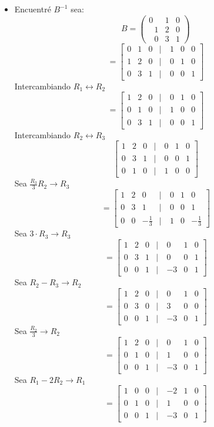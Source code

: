 \begin{itemize}
    \item Encuentré \textbf{$B^{-1}$}
    sea: $$B=\begin{pmatrix}0&1&0\\ \:\:\:1&2&0\\ \:\:\:0&3&1\end{pmatrix}$$
    $$    =\begin{bmatrix}0&1&0&\mid \:&1&0&0\\ 1&2&0&\mid \:&0&1&0\\ 0&3&1&\mid \:&0&0&1\end{bmatrix}$$
    Intercambiando $R_1 \leftrightarrow R_2$
    $$=\begin{bmatrix}1&2&0&\mid \:&0&1&0\\ 0&1&0&\mid \:&1&0&0\\ 0&3&1&\mid \:&0&0&1\end{bmatrix}$$
    Intercambiando $R_2 \leftrightarrow R_3$
    $$\begin{bmatrix}1&2&0&\mid \:&0&1&0\\ 0&3&1&\mid \:&0&0&1\\ 0&1&0&\mid \:&1&0&0\end{bmatrix}$$
    Sea $\frac{R_3}{3}R_2\rightarrow R_3$
    $$=\begin{bmatrix}1&2&0&\mid \:&0&1&0\\ 0&3&1&\mid \:&0&0&1\\ 0&0&-\frac{1}{3}&\mid \:&1&0&-\frac{1}{3}\end{bmatrix}$$
    Sea $3·R_3\rightarrow R_3$
    $$=\begin{bmatrix}1&2&0&\mid \:&0&1&0\\ 0&3&1&\mid \:&0&0&1\\ 0&0&1&\mid \:&-3&0&1\end{bmatrix}$$
    Sea $R_2-R_3 \rightarrow R_2$
    $$=\begin{bmatrix}1&2&0&\mid \:&0&1&0\\ 0&3&0&\mid \:&3&0&0\\ 0&0&1&\mid \:&-3&0&1\end{bmatrix}$$
    Sea $\frac{R_2}{3}\rightarrow R_2$
    $$=\begin{bmatrix}1&2&0&\mid \:&0&1&0\\ 0&1&0&\mid \:&1&0&0\\ 0&0&1&\mid \:&-3&0&1\end{bmatrix}$$
    Sea $R_1-2R_2\rightarrow R_1$
    $$=\begin{bmatrix}1&0&0&\mid \:&-2&1&0\\ 0&1&0&\mid \:&1&0&0\\ 0&0&1&\mid \:&-3&0&1\end{bmatrix}$$
    

\end{itemize}
